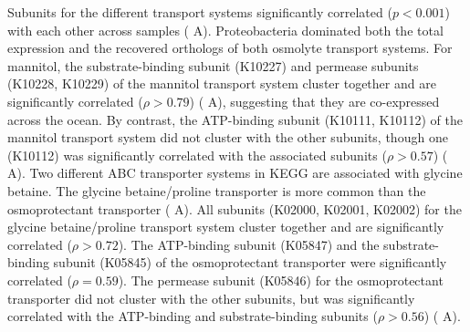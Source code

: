 \documentclass[utf8]{frontiersSCNS} %
\begin{document}
Subunits for the different transport systems significantly correlated ($p<0.001$) with each other across samples ( A). Proteobacteria dominated both the total expression and the recovered orthologs of both osmolyte transport systems. For mannitol, the substrate-binding subunit (K10227) and permease subunits (K10228, K10229) of the mannitol transport system cluster together and are significantly correlated ($\rho > 0.79$)  ( A), suggesting that they are co-expressed across the ocean. By contrast, the ATP-binding subunit (K10111, K10112) of the mannitol transport system did not cluster with the other subunits, though one (K10112) was significantly correlated with the associated subunits ($\rho >0.57$) ( A). Two different ABC transporter systems in KEGG are associated with glycine betaine. The glycine betaine/proline transporter is more common than the osmoprotectant transporter ( A). All subunits (K02000, K02001, K02002) for the glycine betaine/proline transport system cluster together and are significantly correlated ($\rho >0.72$). The ATP-binding subunit (K05847) and the substrate-binding subunit (K05845) of the osmoprotectant transporter were significantly correlated ($\rho=0.59$). The permease subunit (K05846) for the osmoprotectant transporter did not cluster with the other subunits, but was significantly correlated with the ATP-binding and substrate-binding subunits ($\rho>0.56$) ( A). 
\end{document}
